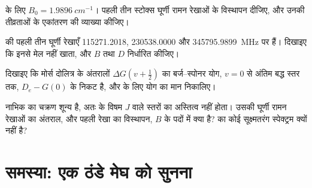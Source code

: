 \begin{exercise}[$\star\star$]\label{exo:b3:rovibrational-spectroscopy:9}
 के लिए $B_0 = \qty{1.9896}{cm^{-1}}$। पहली तीन
स्टोक्स घूर्णी रामन रेखाओं के विस्थापन दीजिए, और उनकी
तीव्रताओं के एकांतरण की व्याख्या कीजिए।
\end{exercise}

\begin{exercise}[$\star\star\star$]\label{exo:b3:rovibrational-spectroscopy:10}
 की पहली तीन घूर्णी रेखाएँ 115271.2018,
230538.0000 और \qty{345795.9899}{MHz} पर हैं। दिखाइए कि  इनसे मेल नहीं खाता,
और $B$ तथा  $D$ निर्धारित कीजिए।
\end{exercise}

\begin{exercise}[$\star\star\star$]\label{exo:b3:rovibrational-spectroscopy:11}
दिखाइए कि मोर्स दोलित्र के अंतरालों $\Delta G(v + \frac12)$ का बर्ज--स्पोनर योग,
$v = 0$ से अंतिम बद्ध स्तर तक, $D_e - G(0)$ के निकट है, और
 के लिए योग का मान निकालिए।
\end{exercise}

\begin{exercise}[$\star\star\star$]\label{exo:b3:rovibrational-spectroscopy:12}
 नाभिक का चक्रण शून्य है, अतः  के विषम
$J$ वाले स्तरों का अस्तित्व नहीं होता। उसकी घूर्णी रामन रेखाओं का अंतराल, और
पहली रेखा का विस्थापन, $B$ के पदों में क्या है?  का कोई सूक्ष्मतरंग
स्पेक्ट्रम क्यों नहीं है?
\end{exercise}

\section{समस्या: एक ठंडे मेघ को सुनना}

